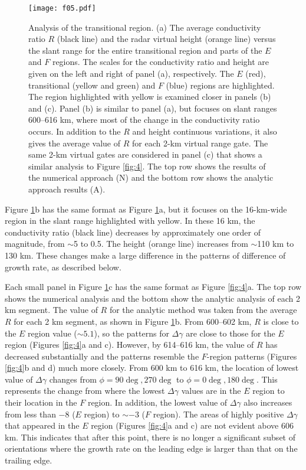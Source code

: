 \begin{figure}
	\centering
	\texttt{[image: f05.pdf]}
	\caption[GDI growth rate within transitional region]{Analysis of the transitional region.  (a) The average conductivity ratio \(R\) (black line) and the radar virtual height (orange line) versus the slant range for the entire transitional region and parts of the \(E\) and \(F\) regions. The scales for the conductivity ratio and height are given on the left and right of panel (a), respectively.  The \(E\) (red), transitional (yellow and green) and \(F\) (blue) regions are highlighted.  The region highlighted with yellow is examined closer in panels (b) and (c).  Panel (b) is similar to panel (a), but focuses on slant ranges 600--616 km, where most of the change in the conductivity ratio occurs.  In addition to the \(R\) and height continuous variations, it also gives the average value of \(R\) for each 2-km virtual range gate. The same 2-km virtual gates are considered in panel (c) that shows a similar analysis to Figure \ref{fig:4}. The top row shows the results of the numerical approach (N) and the bottom row shows the analytic approach results (A).}
	\label{fig:5}
\end{figure}



Figure \ref{fig:5}b has the same format as Figure \ref{fig:5}a, but it focuses on the 16-km-wide region in the slant range highlighted with yellow. In these 16 km, the conductivity ratio (black line) decreases by approximately one order of magnitude, from \(\sim\)5 to 0.5. The height (orange line) increases from \(\sim\)110 km to 130 km. These changes make a large difference in the patterns of difference of growth rate, as described below.



Each small panel in Figure \ref{fig:5}c has the same format as Figure \ref{fig:4}a. The top row shows the numerical analysis and the bottom show the analytic analysis of each 2 km segment.  The value of \(R\) for the analytic method was taken from the average \(R\) for each 2 km segment, as shown in Figure \ref{fig:5}b. From 600--602 km, \(R\) is close to the \(E\) region value (\(\sim5.1\)), so the patterns for \(\Delta\gamma\) are close to those for the \(E\) region (Figures \ref{fig:4}a and c).  However, by 614--616 km, the value of \(R\) has decreased substantially and the patterns resemble the \(F\)-region patterns (Figures \ref{fig:4}b and d) much more closely.  From 600 km to 616 km, the location of lowest value of \(\Delta\gamma\) changes from \(\phi=90\deg,270\deg\) to \(\phi=0\deg,180\deg\).  This represents the change from where the lowest \(\Delta\gamma\) values are in the \(E\) region to their location in the \(F\) region. In addition, the lowest value of \(\Delta\gamma\) also increases from less than \(-8\) (\(E\) region) to \(\sim-3\) (\(F\) region).  The areas of highly positive \(\Delta\gamma\) that appeared in the \(E\) region (Figures \ref{fig:4}a and c) are not evident above 606 km. This indicates that after this point, there is no longer a significant subset of orientations where the growth rate on the leading edge is larger than that on the trailing edge.



